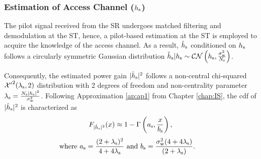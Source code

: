 \subsubsection*{Estimation of Access Channel ($h_{\text{s}}$)}
The pilot signal received from the SR undergoes matched filtering and demodulation at the ST, hence, a pilot-based estimation at the ST is employed to acquire the knowledge of the access channel. %
As a result, $\hat{h}_{\text{s}}$ conditioned on $h_{\text{s}}$ follows a circularly symmetric Gaussian distribution
$\hat{h}_{\text{s}}|h_{\text{s}} \sim \mathcal{CN}\left( h_{\text{s}},\frac{\sigma^2_{\text{w}}}{N_{\text{s}}} \right)$.

Consequently, the estimated power gain $|\hat{h}_{\text{s}}|^2$ follows a non-central chi-squared $\ncchi2(\ls, 2)$ distribution with 2 degrees of freedom and non-centrality parameter $\lambda_{\text{s}} = \frac{N_{\text{s}} |h_{\text{s}}|^2}{\sigma^2_{\text{w}}}$. 
Following Approximation \ref{ap:ap1} from Chapter \ref{chap:IS}, the cdf of $|\hat{h}_{\text{s}}|^2$ is characterized as
\begin{align}
F_{|\hat{h}_{\text{s}}|^2}(x) \approx 1 - \Gamma \left(a_{\text{s}}, \frac{x}{b_{\text{s}}} \right) \label{eq_HS:fephs}, 
\end{align}
\begin{align}
\text{where  } a_{\text{s}} = \frac{(2 + \lambda_{\text{s}})^2}{4 + 4 \lambda_{\text{s}}} &\text{ and } b_{\text{s}} = \frac{\sigma^2_{\text{w}} (4 + 4 \lambda_{\text{s}})}{(2 + \lambda_{\text{s}})}.  \label{eq_HS:para_hs} 
\end{align}


